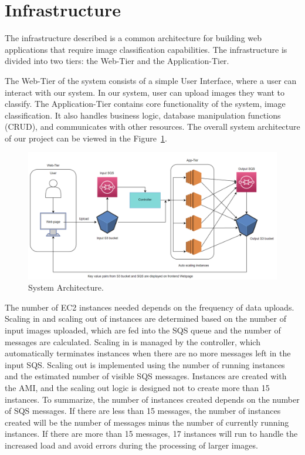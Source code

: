 \documentclass[../main.tex]{subfiles}
\begin{document}
\part*{Infrastructure}
The infrastructure described is a common architecture for building web applications that require image classification capabilities. The infrastructure is divided into two tiers: the Web-Tier and the Application-Tier.

The Web-Tier of the system consists of a simple User Interface, where a user can interact with our system. In our system, user can upload images they want to classify. The Application-Tier contains core functionality of the system, image classification. It also handles business logic, database manipulation functions (CRUD), and communicates with other resources. The overall system architecture of our project can be viewed in the Figure~\ref{fig:arc}.

\begin{figure}[h!]
\centering
\includegraphics[scale=0.68]{images/arc.png}
\caption{System Architecture.}
\label{fig:arc}
\end{figure}

The number of EC2 instances needed depends on the frequency of data uploads. Scaling in and scaling out of instances are determined based on the number of input images uploaded, which are fed into the SQS queue and the number of messages are calculated. Scaling in is managed by the controller, which automatically terminates instances when there are no more messages left in the input SQS. Scaling out is implemented using the number of running instances and the estimated number of visible SQS messages. Instances are created with the AMI, and the scaling out logic is designed not to create more than 15 instances. To summarize, the number of instances created depends on the number of SQS messages. If there are less than 15 messages, the number of instances created will be the number of messages minus the number of currently running instances. If there are more than 15 messages, 17 instances will run to handle the increased load and avoid errors during the processing of larger images.
\end{document}
